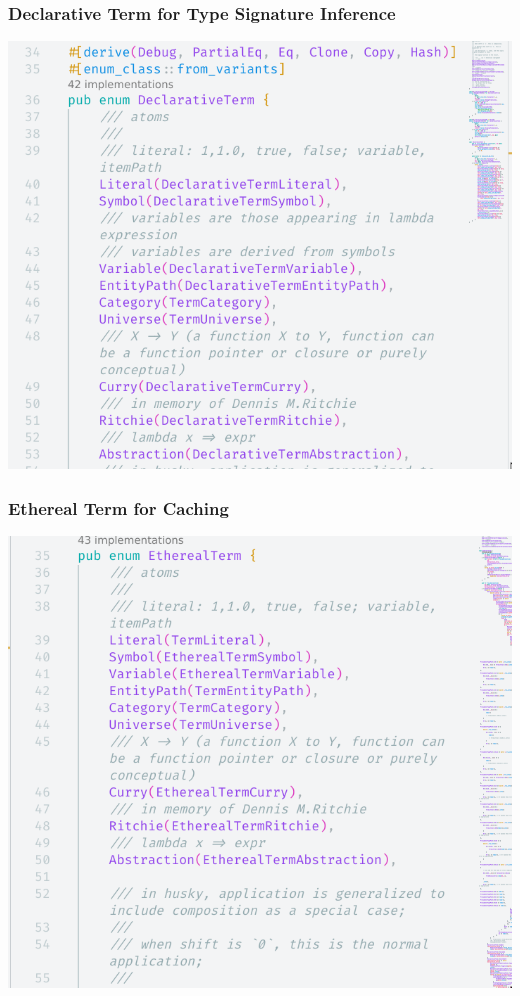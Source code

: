 \documentclass{beamer}   	%
\theoremstyle{definition}
\begin{document}
\begin{frame}
\frametitle{Declarative Term for Type Signature Inference}
\includegraphics[width=\linewidth]{snapshots/husky_declarative_term.png}
\end{frame}

\begin{frame}
\frametitle{Ethereal Term for Caching}
\includegraphics[width=\linewidth]{snapshots/husky_ethereal_term.png}
\end{frame}
\end{document}
